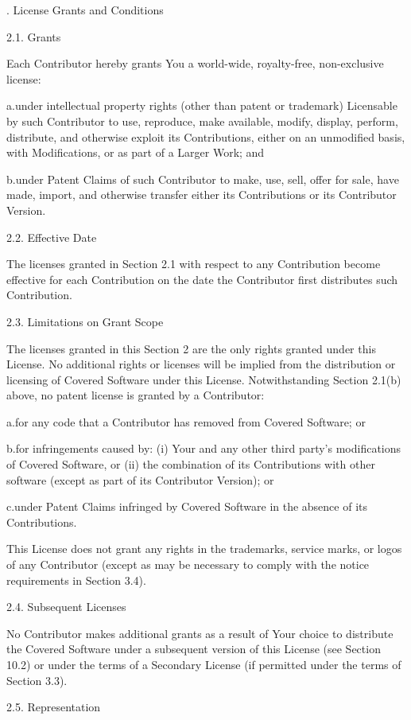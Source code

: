 . License Grants and Conditions

2.1. Grants

Each Contributor hereby grants You a world-wide, royalty-free, non-exclusive license:

a.under intellectual property rights (other than patent or trademark) Licensable by such Contributor to use, reproduce, make available, modify, display, perform, distribute, and otherwise exploit its Contributions, either on an unmodified basis, with Modifications, or as part of a Larger Work; and

b.under Patent Claims of such Contributor to make, use, sell, offer for sale, have made, import, and otherwise transfer either its Contributions or its Contributor Version.

2.2. Effective Date

The licenses granted in Section 2.1 with respect to any Contribution become effective for each Contribution on the date the Contributor first distributes such Contribution.

2.3. Limitations on Grant Scope

The licenses granted in this Section 2 are the only rights granted under this License. No additional rights or licenses will be implied from the distribution or licensing of Covered Software under this License. Notwithstanding Section 2.1(b) above, no patent license is granted by a Contributor:

a.for any code that a Contributor has removed from Covered Software; or

b.for infringements caused by: (i) Your and any other third party’s modifications of Covered Software, or (ii) the combination of its Contributions with other software (except as part of its Contributor Version); or

c.under Patent Claims infringed by Covered Software in the absence of its Contributions.

This License does not grant any rights in the trademarks, service marks, or logos of any Contributor (except as may be necessary to comply with the notice requirements in Section 3.4).

2.4. Subsequent Licenses

No Contributor makes additional grants as a result of Your choice to distribute the Covered Software under a subsequent version of this License (see Section 10.2) or under the terms of a Secondary License (if permitted under the terms of Section 3.3).

2.5. Representation

